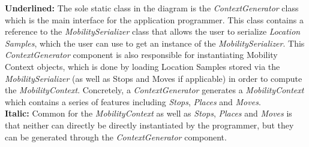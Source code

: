 \textbf{Underlined:} The sole static class in the diagram is the \textit{ContextGenerator} class which is the main interface for the application programmer. This class contains a reference to the \textit{MobilitySerializer} class that allows the user to serialize \textit{Location Samples}, which the user can use to get an instance of the \textit{MobilitySerializer}. This \textit{ContextGenerator} component is also responsible for instantiating  Mobility Context objects, which is done by loading Location Samples stored via the \textit{MobilitySerializer} (as well as Stops and Moves if applicable) in order to compute the \textit{MobilityContext}. Concretely, a \textit{ContextGenerator} generates a \textit{MobilityContext} which contains a series of features including \textit{Stops}, \textit{Places} and \textit{Moves}.\\

\textbf{Italic:} Common for the \textit{MobilityContext} as well as \textit{Stops}, \textit{Places} and \textit{Moves} is that neither can directly be directly instantiated by the programmer, but they can be generated through the \textit{ContextGenerator} component. \\



